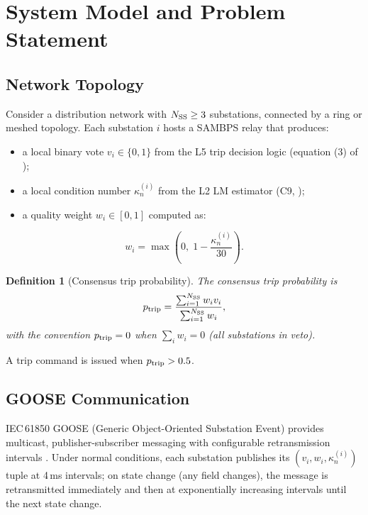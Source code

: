 \documentclass[journal]{IEEEtran}
\newcommand{\kappan}{\kappa_{n}}
\newcommand{\ptrip}{p_{\rm trip}}
\newcommand{\NSS}{N_{\rm SS}}
\newtheorem{definition}{Definition}
\begin{document}
\section{System Model and Problem Statement}
\label{sec:model}

\subsection{Network Topology}

Consider a distribution network with $\NSS \geq 3$ substations,
connected by a ring or meshed topology.  Each substation $i$ hosts
a SAMBPS relay that produces:
\begin{itemize}
  \item a local binary vote $v_i \in \{0,1\}$ from the L5 trip
        decision logic (equation (3) of \cite{sambps_c16_unified});
  \item a local condition number $\kappan^{(i)}$ from the L2 LM
        estimator (C9, \cite{sambps_c9_svd});
  \item a quality weight $w_i \in [0,1]$ computed as:
\end{itemize}
\begin{equation}
\label{eq:weight}
  w_i = \max\!\left(0,\;1 - \frac{\kappan^{(i)}}{30}\right).
\end{equation}

\begin{definition}[Consensus trip probability]
The consensus trip probability is
\begin{equation}
\label{eq:ptrip}
  \ptrip = \frac{\sum_{i=1}^{\NSS} w_i v_i}{\sum_{i=1}^{\NSS} w_i},
\end{equation}
with the convention $\ptrip = 0$ when $\sum_i w_i = 0$ (all
substations in veto).
\end{definition}

A trip command is issued when $\ptrip > 0.5$.

\subsection{GOOSE Communication}

IEC\,61850 GOOSE (Generic Object-Oriented Substation Event) provides
multicast, publisher-subscriber messaging with configurable retransmission
intervals \cite{iec61850}.  Under normal conditions, each substation
publishes its $(v_i, w_i, \kappan^{(i)})$ tuple at 4\,ms intervals;
on state change (any field changes), the message is retransmitted
immediately and then at exponentially increasing intervals until
the next state change.
\end{document}
